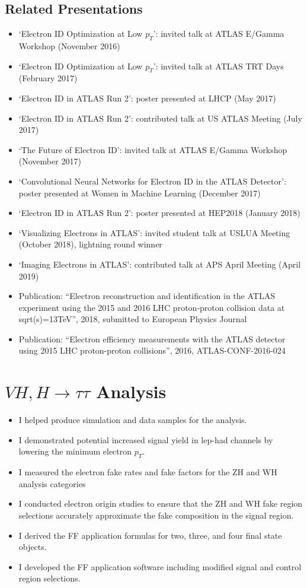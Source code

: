 \subsection{Related Presentations}
\begin{itemize}
    \item `Electron ID Optimization at Low $p_T$’: invited talk at ATLAS E/Gamma Workshop (November 2016)
    \item `Electron ID Optimization at Low $p_T$’: invited talk at ATLAS TRT Days (February 2017)
    \item `Electron ID in ATLAS Run 2’: poster presented at LHCP (May 2017)
    \item `Electron ID in ATLAS Run 2’: contributed talk at US ATLAS Meeting (July 2017)
    \item `The Future of Electron ID’: invited talk at ATLAS E/Gamma Workshop (November 2017)
    \item ‘Convolutional Neural Networks for Electron ID in the ATLAS Detector’: poster presented at Women in Machine Learning (December 2017)
    \item `Electron ID in ATLAS Run 2’: poster presented at HEP2018 (January 2018)
    \item ‘Visualizing Electrons in ATLAS’: invited student talk at USLUA Meeting (October 2018), lightning round winner
    \item `Imaging Electrons in ATLAS': contributed talk at APS April Meeting (April 2019)
    \item Publication: “Electron reconstruction and identification in the ATLAS experiment using the 2015 and 2016 LHC proton-proton collision data at sqrt(s)=13TeV”, 2018, submitted to European Physics Journal
    \item Publication: “Electron efficiency measurements with the ATLAS detector using 2015 LHC proton-proton collisions”, 2016, ATLAS-CONF-2016-024
\end{itemize}

\section{$VH,H\rightarrow\tau\tau$ Analysis}

\begin{itemize}
    \item I helped produce simulation and data samples for the analysis.
    \item I demonstrated potential increased signal yield in lep-had channels by lowering the minimum electron $p_T$. 
    \item I measured the electron fake rates and fake factors for the ZH and WH analysis categories
    \item I conducted electron origin studies to ensure that the ZH and WH fake region selections accurately approximate the fake composition in the signal region. 
    \item I derived the FF application formulas for two, three, and four final state objects.
    \item I developed the FF application software including modified signal and control region selections. 
\end{itemize}

